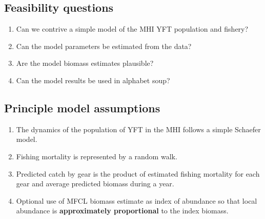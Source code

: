 \documentclass[letterpaper,KOMA,landscape,titlepage]{powersem}
\begin{document}
\begin{slide}\section{Feasibility questions}
\begin{enumerate}
\item Can we contrive a simple model of the MHI YFT population and
fishery?
\item Can the model parameters be estimated from the data?
\item Are the model biomass estimates plausible?
\item Can the model results be used in alphabet soup?
\end{enumerate}
\end{slide}

\begin{slide}\section{Principle model assumptions}
\begin{enumerate}
\item The dynamics of the population of YFT in the MHI follows a
simple Schaefer model.
\item Fishing mortality is represented by a random walk.
\item Predicted catch by gear is the product of estimated fishing mortality
for each gear and average predicted biomass during a year.
\item Optional use of MFCL biomass estimate as index of abundance so
that local abundance is {\bfseries approximately proportional} to the
index biomass.
\end{enumerate}
\end{slide}
\end{document}

